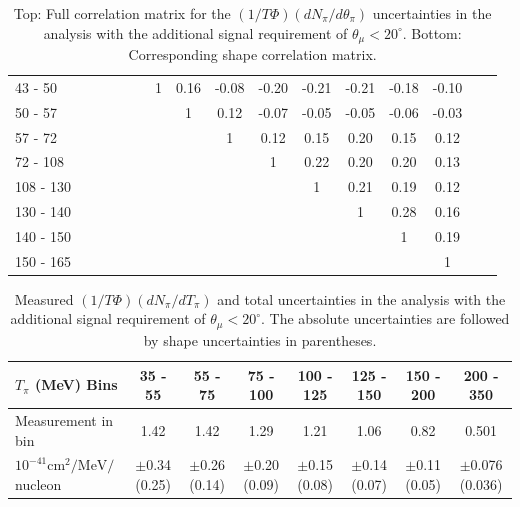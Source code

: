 \begin{table}[h]
\begin{tabular}{l|ccccccccccccccc}
43 - 50 &  &  &  &  &  & 1 & 0.16 & -0.08 & -0.20 & -0.21 & -0.21 & -0.18 & -0.10 \\ 
50 - 57 &  &  &  &  &  &  & 1 & 0.12 & -0.07 & -0.05 & -0.05 & -0.06 & -0.03 \\ 
57 - 72 &  &  &  &  &  &  &  & 1 & 0.12 & 0.15 & 0.20 & 0.15 & 0.12 \\ 
72 - 108 &  &  &  &  &  &  &  &  & 1 & 0.22 & 0.20 & 0.20 & 0.13 \\ 
108 - 130 &  &  &  &  &  &  &  &  &  & 1 & 0.21 & 0.19 & 0.12 \\ 
130 - 140 &  &  &  &  &  &  &  &  &  &  & 1 & 0.28 & 0.16 \\ 
140 - 150 &  &  &  &  &  &  &  &  &  &  &  & 1 & 0.19 \\ 
150 - 165 &  &  &  &  &  &  &  &  &  &  &  &  & 1 \\
\hline\hline
\end{tabular}
\caption{Top: Full correlation matrix for the $(1/T\Phi)(dN_{\pi} / d\theta_\pi)$ uncertainties in the \ccpi analysis with the additional signal requirement of $\theta_\mu < 20^\circ$.  Bottom: Corresponding shape correlation matrix.}
\end{table}
\endgroup

\clearpage
\begingroup
\squeezetable
\begin{table}[h]
\begin{tabular}{l|ccccccc}
\hline\hline
$T_{\pi}$ (MeV) Bins & 35 - 55 & 55 - 75 & 75 - 100 & 100 - 125 & 125 - 150 & 150 - 200 & 200 - 350 \\ 
\hline
Measurement in bin & 1.42 & 1.42 & 1.29 & 1.21 & 1.06 & 0.82 & 0.501 \\ 
$10^{-41}\mathrm{cm}^2/\mathrm{MeV}/$nucleon &  $\pm$0.34 (0.25) &  $\pm$0.26 (0.14) &  $\pm$0.20 (0.09) &  $\pm$0.15 (0.08) &  $\pm$0.14 (0.07) &  $\pm$0.11 (0.05) &  $\pm$0.076 (0.036) \\ 
\hline\hline
\end{tabular}
\caption{Measured $(1/T\Phi)(dN_{\pi} / dT_\pi)$ and total uncertainties in the \ccpi analysis with the additional signal requirement of $\theta_\mu < 20^\circ$.  The absolute uncertainties are followed by shape uncertainties in parentheses.}
\end{table}
\endgroup

